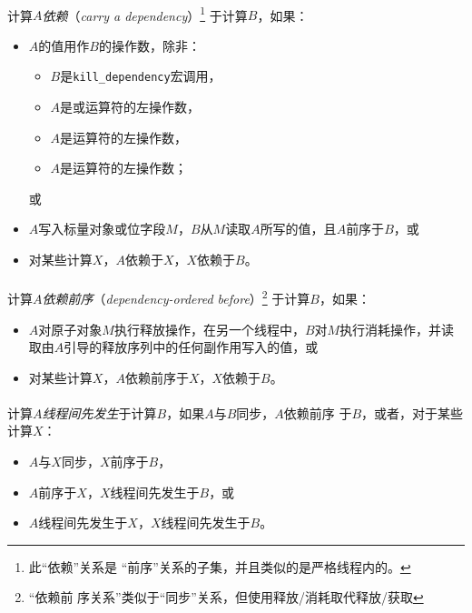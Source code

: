 \paragraph{}
计算$A$\textit{依赖}（\textit{carry a dependency}）\footnote{此``依赖''关系是
``前序''关系的子集，并且类似的是严格线程内的。} 于计算$B$，如果：
\begin{itemize}
  \item{$A$的值用作$B$的操作数，除非：
    \begin{itemize}
      \item{$B$是\texttt{kill\_dependency}宏调用，}
      \item{$A$是\tm{\&\&}或\tm{||}运算符的左操作数，}
      \item{$A$是运算符的左操作数，}
      \item{$A$是\tm{,}运算符的左操作数；}
    \end{itemize}
    或}
  \item{$A$写入标量对象或位字段$M$，$B$从$M$读取$A$所写的值，且$A$前序于$B$，或}
  \item{对某些计算$X$，$A$依赖于$X$，$X$依赖于$B$。}
\end{itemize}

\paragraph{}
计算$A$\textit{依赖前序}（\textit{dependency-ordered before}）\footnote{``依赖前
序关系''类似于``同步''关系，但使用释放/消耗取代释放/获取} 于计算$B$，如果：
\begin{itemize}
  \item{$A$对原子对象$M$执行释放操作，在另一个线程中，$B$对$M$执行消耗操作，并读
    取由$A$引导的释放序列中的任何副作用写入的值，或}
  \item{对某些计算$X$，$A$依赖前序于$X$，$X$依赖于$B$。}
\end{itemize}

\paragraph{}
计算$A$\textit{线程间先发生}于计算$B$，如果$A$与$B$同步，$A$依赖前序
于$B$，或者，对于某些计算$X$：
\begin{itemize}
  \item{$A$与$X$同步，$X$前序于$B$，}
  \item{$A$前序于$X$，$X$线程间先发生于$B$，或}
  \item{$A$线程间先发生于$X$，$X$线程间先发生于$B$。}
\end{itemize}

